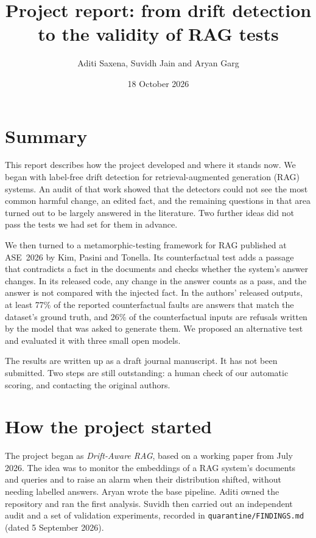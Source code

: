 \documentclass[11pt,a4paper]{article}
\title{Project report: from drift detection to the validity of RAG tests}
\author{Aditi Saxena, Suvidh Jain and Aryan Garg}
\date{18 October 2026}
\begin{document}
\maketitle

\section*{Summary}
This report describes how the project developed and where it stands now. We began with label-free
drift detection for retrieval-augmented generation (RAG) systems. An audit of that work showed that
the detectors could not see the most common harmful change, an edited fact, and the remaining
questions in that area turned out to be largely answered in the literature. Two further ideas did
not pass the tests we had set for them in advance.

We then turned to a metamorphic-testing framework for RAG published at ASE~2026 by Kim, Pasini and
Tonella. Its counterfactual test adds a passage that contradicts a fact in the documents and checks
whether the system's answer changes. In its released code, any change in the answer counts as a pass,
and the answer is not compared with the injected fact. In the authors' released outputs, at least
77\% of the reported counterfactual faults are answers that match the dataset's ground truth, and
26\% of the counterfactual inputs are refusals written by the model that was asked to generate them.
We proposed an alternative test and evaluated it with three small open models.

The results are written up as a draft journal manuscript. It has not been submitted. Two steps are
still outstanding: a human check of our automatic scoring, and contacting the original authors.

\section{How the project started}
The project began as \emph{Drift-Aware RAG}, based on a working paper from July 2026. The idea was to
monitor the embeddings of a RAG system's documents and queries and to raise an alarm when their
distribution shifted, without needing labelled answers. Aryan wrote the base pipeline. Aditi owned
the repository and ran the first analysis. Suvidh then carried out an independent audit and a set of
validation experiments, recorded in \texttt{quarantine/FINDINGS.md} (dated 5 September 2026).
\end{document}
